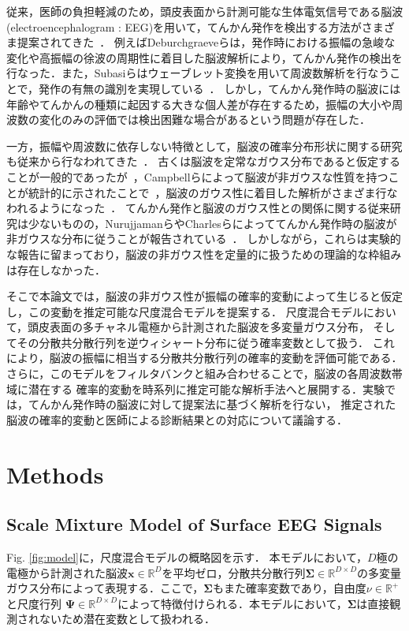 \documentclass[journal]{IEEEtran}
\begin{document}
従来，医師の負担軽減のため，頭皮表面から計測可能な生体電気信号である脳波(electroencephalogram : EEG)を用いて，てんかん発作を検出する方法がさまざま提案されてきた~\cite{Deburchgraeve2008,Subasi2005,kellaway1979precise,Panzica1999,fusco1993ictal,Acir2005,Greene2008}．
例えばDeburchgraeveらは，発作時における振幅の急峻な変化や高振幅の徐波の周期性に着目した脳波解析により，てんかん発作の検出を行なった\cite{Deburchgraeve2008}．また，Subasiらはウェーブレット変換を用いて周波数解析を行なうことで，発作の有無の識別を実現している~\cite{Subasi2005}．
しかし，てんかん発作時の脳波には年齢やてんかんの種類に起因する大きな個人差が存在するため，振幅の大小や周波数の変化のみの評価では検出困難な場合があるという問題が存在した．

一方，振幅や周波数に依存しない特徴として，脳波の確率分布形状に関する研究も従来から行なわれてきた~\cite{Sounders1963,Gonen2012,Campbell1967,Weiss1973,Nurujjaman2009,Charles1999}．
古くは脳波を定常なガウス分布であると仮定することが一般的であったが~\cite{Sounders1963,Gonen2012}，Campbellらによって脳波が非ガウスな性質を持つことが統計的に示されたことで~\cite{Campbell1967}，脳波のガウス性に着目した解析がさまざま行なわれるようになった~\cite{Gonen2012,Weiss1973,Nurujjaman2009,Charles1999}．
てんかん発作と脳波のガウス性との関係に関する従来研究は少ないものの，NurujjamanらやCharlesらによっててんかん発作時の脳波が非ガウスな分布に従うことが報告されている~\cite{Nurujjaman2009,Charles1999}．
しかしながら，これらは実験的な報告に留まっており，脳波の非ガウス性を定量的に扱うための理論的な枠組みは存在しなかった．

そこで本論文では，脳波の非ガウス性が振幅の確率的変動によって生じると仮定し，この変動を推定可能な尺度混合モデルを提案する．
尺度混合モデルにおいて，頭皮表面の多チャネル電極から計測された脳波を多変量ガウス分布，
そしてその分散共分散行列を逆ウィシャート分布に従う確率変数として扱う．
これにより，脳波の振幅に相当する分散共分散行列の確率的変動を評価可能である．
さらに，このモデルをフィルタバンクと組み合わせることで，脳波の各周波数帯域に潜在する
確率的変動を時系列に推定可能な解析手法へと展開する．実験では，てんかん発作時の脳波に対して提案法に基づく解析を行ない，
推定された脳波の確率的変動と医師による診断結果との対応について議論する．

\section{Methods}

\subsection{Scale Mixture Model of Surface EEG Signals}
Fig. \ref{fig:model}に，尺度混合モデルの概略図を示す．
本モデルにおいて，$D$極の電極から計測された脳波$\mathbf{x} \in \mathbb{R}^{D}$を平均ゼロ，分散共分散行列$\bm {\Sigma} \in \mathbb{R}^{D \times D}$の多変量ガウス分布によって表現する．ここで，$\bm {\Sigma}$もまた確率変数であり，自由度$\nu \in \mathbb{R}^+$ と尺度行列 ${\bm \Psi} \in \mathbb{R}^{D \times D}$によって特徴付けられる．本モデルにおいて，$\bm \Sigma$は直接観測されないため潜在変数として扱われる．
\end{document}
